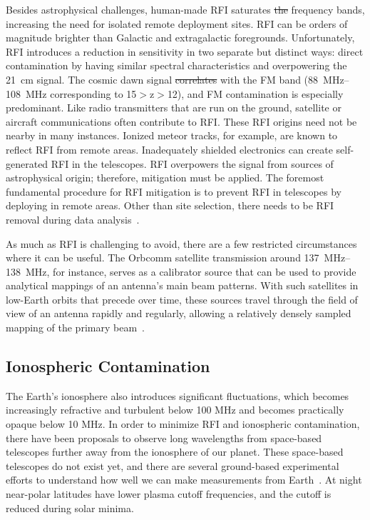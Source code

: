 Besides astrophysical challenges, human-made RFI saturates \st{the}  frequency bands, increasing the need for isolated remote deployment sites. RFI can be orders of magnitude brighter than Galactic and extragalactic foregrounds. Unfortunately, RFI introduces a reduction in sensitivity in two separate but distinct ways: direct contamination by having similar spectral characteristics and overpowering the \SI{21}{\centi \meter} signal. The cosmic dawn signal \st{correlates}  with the FM band (\SIrange{88}{108}{\mega \hertz} corresponding to 15$>$z$>$12), and FM contamination is especially predominant. Like radio transmitters that are run on the ground, satellite or aircraft communications often contribute to RFI. These RFI origins need not be nearby in many instances. Ionized meteor tracks, for example, are known to reflect RFI from remote areas. Inadequately shielded electronics can create self-generated RFI in the telescopes. RFI overpowers the signal from sources of astrophysical origin; therefore, mitigation must be applied. The foremost fundamental procedure for RFI mitigation is to prevent RFI in telescopes by deploying in remote areas. Other than site selection, there needs to be RFI removal during data analysis~\citep{2020PASP..132f2001L}. 

As much as RFI is challenging to avoid, there are a few restricted circumstances where it can be useful. The Orbcomm satellite transmission around \SIrange{137}{138}{\mega \hertz}, for instance, serves as a calibrator source that can be used to provide analytical mappings of an antenna's main beam patterns. With such satellites in low-Earth orbits that precede over time, these sources travel through the field of view of an antenna rapidly and regularly,  allowing a relatively densely sampled mapping of the primary beam~\citep{2015RaSc...50..614N, 2018PASA...35...45L}. 

\subsection*{Ionospheric Contamination}

The Earth's ionosphere also introduces significant fluctuations, which becomes increasingly refractive and turbulent below 100 MHz and becomes practically opaque below 10 MHz. In order to minimize RFI and ionospheric contamination, there have been proposals to observe long wavelengths from space-based telescopes further away from the ionosphere of our planet. These space-based telescopes do not exist yet, and there are several ground-based experimental efforts to understand how well we can make measurements from Earth~\citep{2019arXiv190710853C, 2019arXiv190804296K}. At night near-polar latitudes have lower plasma cutoff frequencies, and the cutoff is reduced during solar minima.

